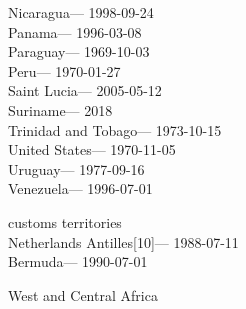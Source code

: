 \hspace*{0.333em}Nicaragua--- 1998-09-24\\
\hspace*{0.333em}Panama--- 1996-03-08\\
\hspace*{0.333em}Paraguay--- 1969-10-03\\
\hspace*{0.333em}Peru--- 1970-01-27\\
\hspace*{0.333em}Saint Lucia--- 2005-05-12\\
\hspace*{0.333em}Suriname--- 2018\\
\hspace*{0.333em}Trinidad and Tobago--- 1973-10-15\\
\hspace*{0.333em}United States--- 1970-11-05\\
\hspace*{0.333em}Uruguay--- 1977-09-16\\
\hspace*{0.333em}Venezuela--- 1996-07-01

customs territories\\
\hspace*{0.333em}Netherlands Antilles{[}10{]}--- 1988-07-11\\
\hspace*{0.333em}Bermuda--- 1990-07-01

West and Central Africa

